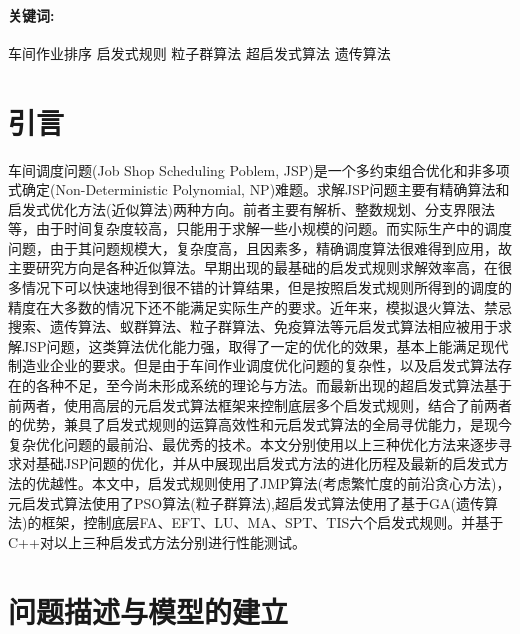 \documentclass[UTF8]{ctexart}
\begin{document}
\paragraph{关键词:}车间作业排序 \space 启发式规则 \space 粒子群算法 \space 超启发式算法 \space 遗传算法
\begin{multicols}{2}
\section{引言}车间调度问题(Job Shop Scheduling Poblem, JSP)是一个多约束组合优化和非多项式确定(Non-Deterministic Polynomial, NP)难题。求解JSP问题主要有精确算法和启发式优化方法(近似算法)两种方向。前者主要有解析、整数规划、分支界限法等，由于时间复杂度较高，只能用于求解一些小规模的问题。而实际生产中的调度问题，由于其问题规模大，复杂度高，且因素多，精确调度算法很难得到应用，故主要研究方向是各种近似算法。早期出现的最基础的启发式规则求解效率高，在很多情况下可以快速地得到很不错的计算结果，但是按照启发式规则所得到的调度的精度在大多数的情况下还不能满足实际生产的要求。近年来，模拟退火算法、禁忌搜索、遗传算法、蚁群算法、粒子群算法、免疫算法等元启发式算法相应被用于求解JSP问题，这类算法优化能力强，取得了一定的优化的效果，基本上能满足现代制造业企业的要求。但是由于车间作业调度优化问题的复杂性，以及启发式算法存在的各种不足，至今尚未形成系统的理论与方法。而最新出现的超启发式算法基于前两者，使用高层的元启发式算法框架来控制底层多个启发式规则，结合了前两者的优势，兼具了启发式规则的运算高效性和元启发式算法的全局寻优能力，是现今复杂优化问题的最前沿、最优秀的技术。本文分别使用以上三种优化方法来逐步寻求对基础JSP问题的优化，并从中展现出启发式方法的进化历程及最新的启发式方法的优越性。本文中，启发式规则使用了JMP算法(考虑繁忙度的前沿贪心方法)，元启发式算法使用了PSO算法(粒子群算法),超启发式算法使用了基于GA(遗传算法)的框架，控制底层FA、EFT、LU、MA、SPT、TIS六个启发式规则。并基于C++对以上三种启发式方法分别进行性能测试。
\section{问题描述与模型的建立}

\end{multicols}
\end{document}
